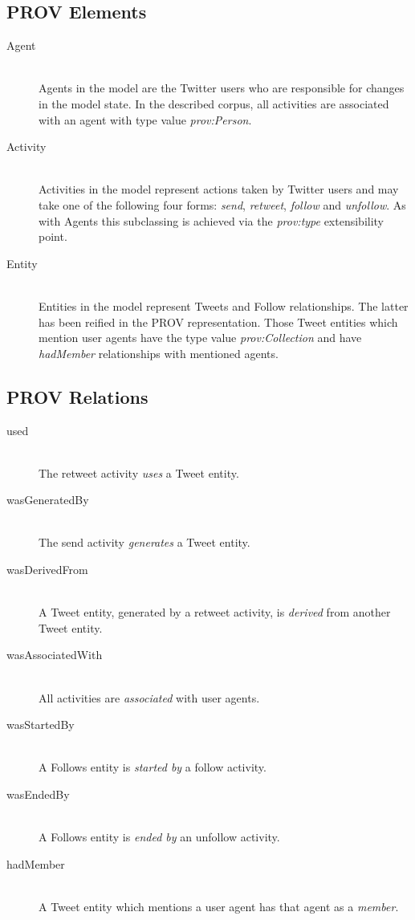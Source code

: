 \documentclass{llncs2e/llncs}
\begin{document}
\subsection{PROV Elements}
%
\begin{description}
  \item[Agent] \hfill \\
  Agents in the model are the Twitter users who are responsible for changes in the model state. In the described corpus, all activities are associated with an agent with type value \textit{prov:Person}.
  \item[Activity] \hfill \\
  Activities in the model represent actions taken by Twitter users and may take one of the following four forms: \textit{send}, \textit{retweet}, \textit{follow} and \textit{unfollow}. As with Agents this subclassing is achieved via the \textit{prov:type} extensibility point.
  \item[Entity] \hfill \\
  Entities in the model represent Tweets and Follow relationships. The latter has been reified in the PROV representation. Those Tweet entities which mention user agents have the type value \textit{prov:Collection} and have \textit{hadMember} relationships with mentioned agents.
\end{description}
%
\subsection{PROV Relations}
%
\begin{description}
  \item[used] \hfill \\
  The retweet activity \textit{uses} a Tweet entity.
  \item[wasGeneratedBy] \hfill \\
  The send activity \textit{generates} a Tweet entity.
  \item[wasDerivedFrom] \hfill \\
  A Tweet entity, generated by a retweet activity, is \textit{derived} from another Tweet entity.
  \item[wasAssociatedWith] \hfill \\
  All activities are \textit{associated} with user agents.
  \item[wasStartedBy] \hfill \\
  A Follows entity is \textit{started by} a follow activity. 
  \item[wasEndedBy] \hfill \\
  A Follows entity is \textit{ended by} an unfollow activity.
  \item[hadMember] \hfill \\
  A Tweet entity which mentions a user agent has that agent as a \textit{member}.
\end{description}
%
\end{document}
